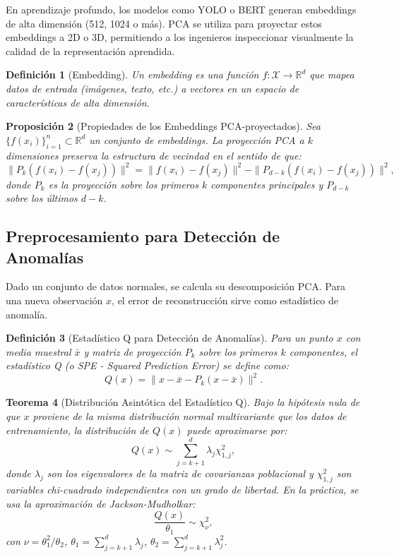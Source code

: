\documentclass[11pt]{article}
\theoremstyle{plain}
\newtheorem{theorem}{Teorema}[section]
\newtheorem{proposition}[theorem]{Proposición}
\newtheorem{definition}[theorem]{Definición}
\begin{document}
En aprendizaje profundo, los modelos como YOLO o BERT generan embeddings de alta dimensión (512, 1024 o más). PCA se utiliza para proyectar estos embeddings a 2D o 3D, permitiendo a los ingenieros inspeccionar visualmente la calidad de la representación aprendida.

\begin{definition}[Embedding]
Un embedding es una función $f: \mathcal{X} \to \mathbb{R}^d$ que mapea datos de entrada (imágenes, texto, etc.) a vectores en un espacio de características de alta dimensión.
\end{definition}

\begin{proposition}[Propiedades de los Embeddings PCA-proyectados]
Sea $\{f(x_i)\}_{i=1}^n \subset \mathbb{R}^d$ un conjunto de embeddings. La proyección PCA a $k$ dimensiones preserva la estructura de vecindad en el sentido de que:
\[
\|P_k(f(x_i) - f(x_j))\|^2 = \|f(x_i) - f(x_j)\|^2 - \|P_{d-k}(f(x_i) - f(x_j))\|^2,
\]
donde $P_k$ es la proyección sobre los primeros $k$ componentes principales y $P_{d-k}$ sobre los últimos $d-k$.
\end{proposition}

\subsection{Preprocesamiento para Detección de Anomalías}

Dado un conjunto de datos normales, se calcula su descomposición PCA. Para una nueva observación $x$, el error de reconstrucción sirve como estadístico de anomalía.

\begin{definition}[Estadístico Q para Detección de Anomalías]
Para un punto $x$ con media muestral $\bar{x}$ y matriz de proyección $P_k$ sobre los primeros $k$ componentes, el estadístico Q (o SPE - Squared Prediction Error) se define como:
\[
Q(x) = \| x - \bar{x} - P_k(x - \bar{x}) \|^2.
\]
\end{definition}

\begin{theorem}[Distribución Asintótica del Estadístico Q]
Bajo la hipótesis nula de que $x$ proviene de la misma distribución normal multivariante que los datos de entrenamiento, la distribución de $Q(x)$ puede aproximarse por:
\[
Q(x) \sim \sum_{j=k+1}^d \lambda_j \chi^2_{1,j},
\]
donde $\lambda_j$ son los eigenvalores de la matriz de covarianzas poblacional y $\chi^2_{1,j}$ son variables chi-cuadrado independientes con un grado de libertad. En la práctica, se usa la aproximación de Jackson-Mudholkar:
\[
\frac{Q(x)}{\theta_1} \sim \chi^2_{\nu},
\]
con $\nu = \theta_1^2 / \theta_2$, $\theta_1 = \sum_{j=k+1}^d \lambda_j$, $\theta_2 = \sum_{j=k+1}^d \lambda_j^2$.
\end{theorem}
\end{document}
